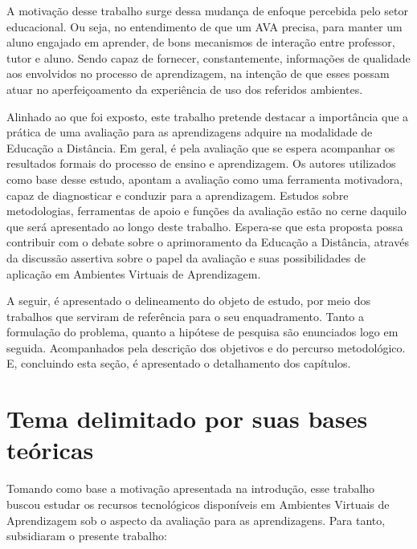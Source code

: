 A motivação desse trabalho surge dessa mudança de enfoque percebida pelo setor educacional. Ou seja, no entendimento de que um AVA precisa, para manter um aluno engajado em aprender, de bons mecanismos de interação entre professor, tutor e aluno. Sendo capaz de fornecer, constantemente, informações de qualidade aos envolvidos no processo de aprendizagem, na intenção de que esses possam atuar no aperfeiçoamento da experiência de uso dos referidos ambientes. 

Alinhado ao que foi exposto, este trabalho pretende destacar a importância que a prática de uma avaliação para as aprendizagens adquire na modalidade de Educação a Distância. Em geral, é pela avaliação que se espera acompanhar os resultados formais do processo de ensino e aprendizagem. Os autores utilizados como base desse estudo, apontam a avaliação como uma ferramenta motivadora, capaz de diagnosticar e conduzir para a aprendizagem. Estudos sobre metodologias, ferramentas de apoio e funções da avaliação estão no cerne daquilo que será apresentado ao longo deste trabalho. Espera-se que esta proposta possa contribuir com o debate sobre o aprimoramento da Educação a Distância, através da discussão assertiva sobre o papel da avaliação e suas possibilidades de aplicação em Ambientes Virtuais de Aprendizagem. 

A seguir, é apresentado o delineamento do objeto de estudo, por meio dos trabalhos que serviram de referência para o seu enquadramento. Tanto a formulação do problema, quanto a hipótese de pesquisa são enunciados logo em seguida. Acompanhados pela descrição dos objetivos e do percurso metodológico. E, concluindo esta seção, é apresentado o detalhamento dos capítulos.

\section{Tema delimitado por suas bases teóricas}%

    Tomando como base a motivação apresentada na introdução, esse trabalho buscou estudar os recursos tecnológicos disponíveis em Ambientes Virtuais de Aprendizagem sob o aspecto da avaliação para as aprendizagens. Para tanto, subsidiaram o presente trabalho:

